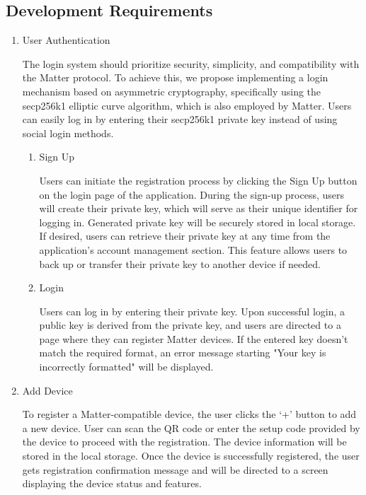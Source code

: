 \documentclass[conference]{IEEEtran}
\begin{document}
\subsection{Development Requirements}

\begin{enumerate}[itemsep=2ex, parsep=1ex]
	\item User Authentication
	      	      	              
	      The login system should prioritize security, simplicity, and compatibility with the Matter protocol. To achieve this, we propose implementing a login mechanism based on asymmetric cryptography, specifically using the secp256k1 elliptic curve algorithm, which is also employed by Matter. Users can easily log in by entering their secp256k1 private key instead of using social login methods.
	      	      	              
	      \begin{enumerate}[itemsep=2ex, parsep=1ex]
	      	\item Sign Up
	      	      	      	      	      	      
	      	      Users can initiate the registration process by clicking the Sign Up button on the login page of the application. During the sign-up process, users will create their private key, which will serve as their unique identifier for logging in. Generated private key will be securely stored in local storage. If desired, users can retrieve their private key at any time from the application's account management section. This feature allows users to back up or transfer their private key to another device if needed.
	      	      	      	      	      	      
	      	\item Login
	      	      	      	      	      	      
	      	      Users can log in by entering their private key.
	      	      Upon successful login, a public key is derived from the private key, and users are directed to a page where they can register Matter devices. If the entered key doesn't match the required format, an error message starting "Your key is incorrectly formatted" will be displayed.
	      \end{enumerate}
	      	      	              
	\item Add Device
	      	      	      
	      To register a Matter-compatible device, the user clicks the ‘+’ button to add a new device. User can scan the QR code or enter the setup code provided by the device to proceed with the registration. The device information will be stored in the local storage. Once the device is successfully registered, the user gets registration confirmation message and will be directed to a screen displaying the device status and features.
	      	      	              

\end{enumerate}
\end{document}
